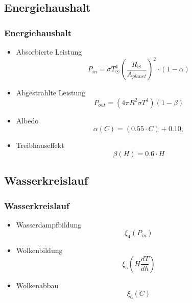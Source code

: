 \documentclass[ngerman]{beamer}
\begin{document}
\subsection{Energiehaushalt}
\begin{frame}
\frametitle{Energiehaushalt}
\begin{itemize}
	\item[] Absorbierte Leistung
	\begin{equation}
	P_{in} = \sigma T_{\astrosun}^4 \left( \frac{R_{\astrosun}}{A_{planet}} \right) ^2 \cdot (1-\alpha)
	\end{equation}
	\pause
	
	\item[] Abgestrahlte Leistung
	\begin{equation}
	P_{out} = (4 \pi R^2 \sigma T^4)(1 - \beta)
	\end{equation}
	\pause
	
	\item[] Albedo
	\begin{equation}
	\alpha(C) = (0.55 \cdot C) + 0.10;
	\end{equation}
	\pause
	
	\item[] Treibhauseffekt
	\begin{equation}
	\beta(H) = 0.6 \cdot H
	\end{equation}
\end{itemize}
\end{frame}




\subsection{Wasserkreislauf}

\begin{frame}
	\frametitle{Wasserkreislauf}
	\begin{itemize}
		\item[] Wasserdampfbildung
			\begin{equation}
			\xi_4 (P_{in})
			\end{equation} 
		\pause
		\item[] Wolkenbildung
			\begin{equation}
			\xi_5 \left( H \frac{dT}{dh} \right)
			\end{equation}
		\pause
		\item[] Wolkenabbau 
		 	\begin{equation}
			\xi_6 (C)
			\end{equation}
	\end{itemize}
\end{frame}
\end{document}
